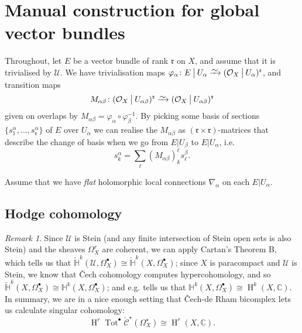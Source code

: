 \documentclass[11pt,fleqn]{article}
\theoremstyle{plain}
\theoremstyle{definition}
\theoremstyle{remark}
\newtheorem{remark}[theorem]{Remark}
\numberwithin{equation}{theorem}
\newcommand{\cover}{\mathcal{U}}
\newcommand{\OO}{\mathcal{O}}
\newcommand{\anotherbullet}{\star}
\newcommand{\restricted}{\mathbin{\big\vert}}
\newcommand{\congto}{\xrightarrow{\raisebox{-.5ex}[0ex][0ex]{$\sim$}}}
\newcommand{\cech}{\check{\mathscr{C}}}
\DeclareMathOperator{\Tot}{Tot}
\DeclareMathOperator{\HH}{H}
\begin{document}
\section{Manual construction for global vector bundles}\label{section:manual-construction}


    Throughout, let $E$ be a vector bundle of rank $\mathfrak{r}$ on $X$, and assume that it is trivialised by $\cover$.
    We have trivialisation maps $\varphi_\alpha\colon E\restricted U_\alpha\congto(\OO_X\restricted U_\alpha)^\mathfrak{r}$, and transition maps
    \[
        M_{\alpha\beta}\colon(\OO_X\restricted{U_{\alpha\beta}})^\mathfrak{r}\congto(\OO_X\restricted{U_{\alpha\beta}})^\mathfrak{r}
    \]
    given on overlaps by \mbox{$M_{\alpha\beta}=\varphi_\alpha\circ\varphi_\beta^{-1}$}.
    By picking some basis of sections $\{s^{\alpha}_1,\ldots,s^{\alpha}_\mathfrak{r}\}$ of $E$ over $U_\alpha$ we can realise the $M_{\alpha\beta}$ as $(\mathfrak{r}\times\mathfrak{r})$-matrices that describe the change of basis when we go from $E\restricted U_\beta$ to $E\restricted U_\alpha$, i.e.
    \begin{equation}
    \label{equation:transition-maps}
        s^\alpha_k = \sum_\ell(M_{\alpha\beta})_k^\ell s^\beta_\ell.
    \end{equation}

    Assume that we have \emph{flat} holomorphic local connections $\nabla_\alpha$ on each $E\restricted U_\alpha$.

    \subsection{Hodge cohomology}

        \begin{remark}\label{remark:we-can-calculate-in-cech}
            Since $\cover$ is Stein (and any finite intersection of Stein open sets is also Stein) and the sheaves $\Omega_X^r$ are coherent, we can apply Cartan's Theorem B, which tells us that $\check{\mathbb{H}}^k(\cover,\Omega_X^\bullet) \cong \check{\mathbb{H}}^k(X,\Omega_X^\bullet)$; since $X$ is paracompact and $\cover$ is Stein, we know that Čech cohomology computes hypercohomology, and so $\check{\mathbb{H}}^k(X,\Omega_X^\bullet) \cong \mathbb{H}^k(X,\Omega_X^\bullet)$; and e.g. \cite[Theorem~8.1]{Voisin2002a} tells us that $\mathbb{H}^k(X,\Omega_X^\bullet) \cong \HH^k\left(X,\mathbb{C}\right)$.
            In summary, we are in a nice enough setting that Čech-de Rham bicomplex lets us calculate singular cohomology:
            \begin{equation*}
                \HH^r\Tot^\bullet\cech^\anotherbullet\left(\Omega^\anotherbullet_X\right) \cong \HH^r\left(X,\mathbb{C}\right).
            \end{equation*}
        \end{remark}
\end{document}
